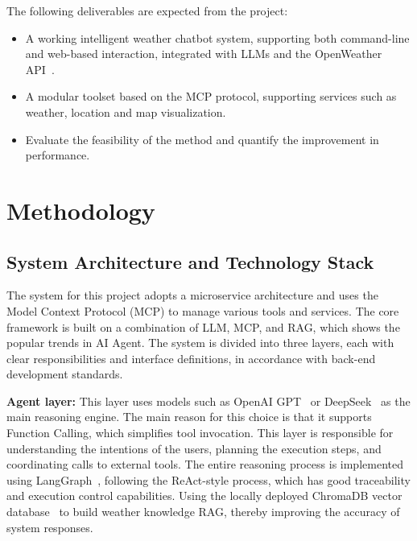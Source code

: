 \documentclass[final-report]{report-template}
\begin{document}
The following deliverables are expected from the project:

\begin{itemize}
  \item A working intelligent weather chatbot system, supporting both command-line and web-based interaction, integrated with LLMs and the OpenWeather API~\cite{OpenWeatherAPI}.
  \item A modular toolset based on the MCP protocol, supporting services such as weather, location and map visualization.
  \item Evaluate the feasibility of the method and quantify the improvement in performance.
\end{itemize}



\newpage
\section{Methodology}
\subsection{System Architecture and Technology Stack}

The system for this project adopts a microservice architecture and uses the Model Context Protocol (MCP) to manage various tools and services. The core framework is built on a combination of LLM, MCP, and RAG, which shows the popular trends in AI Agent. The system is divided into three layers, each with clear responsibilities and interface definitions, in accordance with back-end development standards.


\textbf{Agent layer:}
This layer uses models such as OpenAI GPT~\cite{OpenAI2025} or DeepSeek~\cite{DeepSeek2025} as the main reasoning engine. The main reason for this choice is that it supports Function Calling, which simplifies tool invocation. This layer is responsible for understanding the intentions of the users, planning the execution steps, and coordinating calls to external tools. The entire reasoning process is implemented using LangGraph~\cite{LangGraph2025}, following the ReAct-style process, which has good traceability and execution control capabilities. Using the locally deployed ChromaDB vector database~\cite{Chroma2025} to build weather knowledge RAG, thereby improving the accuracy of system responses.
\end{document}
